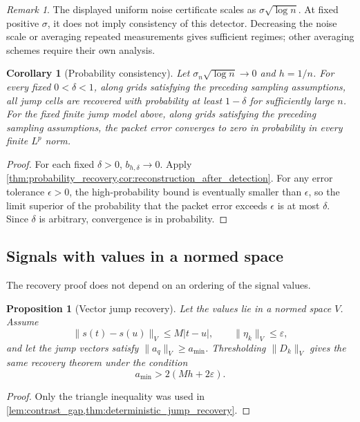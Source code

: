 \documentclass[11pt,letterpaper]{article}
\theoremstyle{plain}
\newtheorem{proposition}[proposition]{Proposition}
\theoremstyle{plain}
\theoremstyle{plain}
\newtheorem{corollary}[corollary]{Corollary}
\theoremstyle{definition}
\theoremstyle{definition}
\theoremstyle{definition}
\theoremstyle{definition}
\theoremstyle{remark}
\newtheorem{remark}[remark]{Remark}
\theoremstyle{remark}
\theoremstyle{remark}
\theoremstyle{remark}
\begin{document}
\begin{remark}\label{rem:noise_scaling}
The displayed uniform noise certificate scales as \(\sigma\sqrt{\log n}\). At fixed positive \(\sigma\), it does not imply consistency of this detector. Decreasing the noise scale or averaging repeated measurements gives sufficient regimes; other averaging schemes require their own analysis.
\end{remark}

\begin{corollary}[Probability consistency]\label{cor:probability_consistency}
Let \(\sigma_n\sqrt{\log n}\to0\) and \(h=1/n\). For every fixed \(0<\delta<1\), along grids satisfying the preceding sampling assumptions, all jump cells are recovered with probability at least \(1-\delta\) for sufficiently large \(n\). For the fixed finite jump model above, along grids satisfying the preceding sampling assumptions, the packet error converges to zero in probability in every finite \(L^p\) norm.
\end{corollary}

\begin{proof}
For each fixed \(\delta>0\), \(b_{h,\delta}\to0\). Apply \cref{thm:probability_recovery,cor:reconstruction_after_detection}. For any error tolerance \(\epsilon>0\), the high-probability bound is eventually smaller than \(\epsilon\), so the limit superior of the probability that the packet error exceeds \(\epsilon\) is at most \(\delta\). Since \(\delta\) is arbitrary, convergence is in probability.
\end{proof}

\subsection{Signals with values in a normed space}

The recovery proof does not depend on an ordering of the signal values.

\begin{proposition}[Vector jump recovery]\label{prop:vector_jump_recovery}
Let the values lie in a normed space \(V\). Assume
\[
\|s(t)-s(u)\|_V\leq M|t-u|,
\qquad
\|\eta_k\|_V\leq\varepsilon,
\]
and let the jump vectors satisfy \(\|a_q\|_V\geq a_{\min}\). Thresholding \(\|D_k\|_V\) gives the same recovery theorem under the condition
\[
a_{\min}>2(Mh+2\varepsilon).
\]
\end{proposition}

\begin{proof}
Only the triangle inequality was used in \cref{lem:contrast_gap,thm:deterministic_jump_recovery}.
\end{proof}
\end{document}
